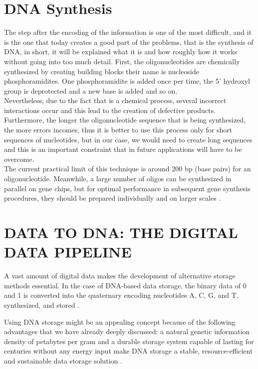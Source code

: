\documentclass[10pt,twocolumn,twoside]{gsajnl}
\begin{document}
\section{DNA Synthesis }
The step after the encoding of the information is one of the most difficult, and it is the one that today creates a good part of the problems, that is the synthesis of DNA, in short, it will be explained what it is and how roughly how it works without going into too much detail.
First, the oligonucleotides are chemically synthesized by creating building blocks their name is nucleoside phosphoramidites. One phosphoramidite is added once per time, the 5' hydroxyl group is deprotected and a new base is added and so on.\\
Nevertheless, due to the fact that is a chemical process, several incorrect interactions occur and this lead to the creation of defective products. 
Furthermore, the longer the oligonucleotide sequence that is being synthesized, the more errors incomes, thus it is better to use this process only for short sequences of nucleotides, but in our case, we would need to create long sequences and this is an important constraint that in future applications will have to be overcome. \\
The current practical limit of this technique is around 200 bp (base pairs) for an oligonucleotide. Meanwhile, a large number of oligos can be synthesized in parallel on gene chips, but for optimal performance in subsequent gene synthesis procedures, they should be prepared individually and on larger scales \cite{wiki:Artificial_gene_synthesis}.

\section{DATA TO DNA: THE DIGITAL DATA PIPELINE }
A vast amount of digital data makes the development of alternative storage methods essential. In the case of DNA-based data storage, the binary data of 0 and 1 is converted into the quaternary encoding nucleotides A, C, G, and T, synthesized, and stored \cite{choi2019high}.
\par Using DNA storage might be an appealing concept because of the following advantages that we have already deeply discussed: a natural genetic information density of petabytes per gram and a durable storage system capable of lasting for centuries without any energy input make DNA storage a stable, resource-efficient and sustainable data storage solution \cite{dong2020dna}.
\end{document}
